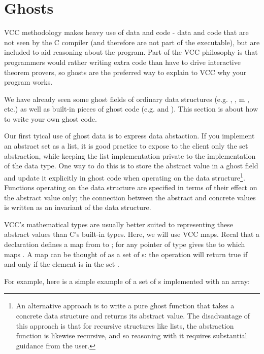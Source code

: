 \section{Ghosts}
\label{sect:ghosts}

VCC methodology makes heavy use of  data and code - data
and code that are not seen by the C compiler (and therefore are not
part of the executable), but are included to aid reasoning about the
program. Part of the VCC philosophy is that programmers would rather
writing extra code than have to drive interactive theorem provers, so
ghosts are the preferred way to explain to VCC why your program works.

We have already seen some ghost fields of ordinary data structures
(e.g. \vcc{\closed}, \vcc{\owner}, \vcc{\owns}m \vcc{\valid}, etc.) as
well as built-in pieces of ghost code (e.g.  and
). This section is about how to write your own
ghost code. 

Our first tyical use of ghost data is to express data abstaction. If
you implement an abstract set as a list, it is good practice to expose
to the client only the set abstraction, while keeping the list
implementation private to the implementation of the data type. One way
to do this is to store the abstract value in a ghost field and update
it explicitly in ghost code when operating on the data
structure\footnote{ An alternative approach is to write a pure ghost
  function that takes a concrete data structure and returns its
  abstract value.  The disadvantage of this approach is that for
  recursive structures like lists, the abstraction function is
  likewise recursive, and so reasoning with it requires substantial
  guidance from the user.}. Functions operating on the data structure
are specified in terms of their effect on the abstract value only; the
connection between the abstract and concrete values is written as an
invariant of the data structure.

VCC's mathematical types are usually better suited to representing these
abstract values than C's built-in types. Here, we will use VCC maps.
Recal that a declaration  defines a map  from
 to ; for any pointer  of type 
 gives the  to which  maps .
A map  can be thought of as a set of s: the operation
 will return true if and only if the element  is in the set .

For example, here is a simple example of a set of s implemented with an array:

